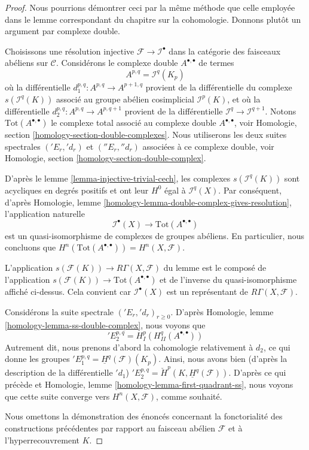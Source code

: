 \begin{proof}
Nous pourrions démontrer ceci par la même méthode que celle employée dans le lemme
correspondant du chapitre sur la cohomologie. Donnons plutôt un argument
par complexe double.

\medskip\noindent
Choisissons une résolution injective $\mathcal{F} \to \mathcal{I}^\bullet$
dans la catégorie des faisceaux abéliens sur $\mathcal{C}$. Considérons le
complexe double $A^{\bullet, \bullet}$ de termes
$$
A^{p, q} = \mathcal{I}^q(K_p)
$$
où la différentielle $d_1^{p, q} : A^{p, q} \to A^{p + 1, q}$ provient
de la différentielle du complexe $s(\mathcal{I}^q(K))$
associé au groupe abélien cosimplicial $\mathcal{I}^p(K)$,
et où la différentielle $d_2^{p, q} : A^{p, q} \to A^{p, q + 1}$ provient
de la différentielle $\mathcal{I}^q \to \mathcal{I}^{q + 1}$.
Notons $\text{Tot}(A^{\bullet, \bullet})$ le complexe total associé au
complexe double $A^{\bullet, \bullet}$, voir
Homologie, section \ref{homology-section-double-complexes}.
Nous utiliserons les deux suites
spectrales $({}'E_r, {}'d_r)$ et $({}''E_r, {}''d_r)$
associées à ce complexe double, voir
Homologie, section \ref{homology-section-double-complex}.

\medskip\noindent
D'après le lemme \ref{lemma-injective-trivial-cech},
les complexes $s(\mathcal{I}^q(K))$ sont acycliques en
degrés positifs et ont leur $H^0$ égal à $\mathcal{I}^q(X)$.
Par conséquent, d'après
Homologie, lemme \ref{homology-lemma-double-complex-gives-resolution},
l'application naturelle
$$
\mathcal{I}^\bullet(X) \longrightarrow \text{Tot}(A^{\bullet, \bullet})
$$
est un quasi-isomorphisme de complexes de groupes abéliens. En particulier,
nous concluons que $H^n(\text{Tot}(A^{\bullet, \bullet})) = H^n(X, \mathcal{F})$.

\medskip\noindent
L'application $s(\mathcal{F}(K)) \longrightarrow R\Gamma(X, \mathcal{F})$ du
lemme est le composé de l'application
$s(\mathcal{F}(K)) \to \text{Tot}(A^{\bullet, \bullet})$
et de l'inverse
du quasi-isomorphisme affiché ci-dessus. Cela convient car
$\mathcal{I}^\bullet(X)$ est un représentant de $R\Gamma(X, \mathcal{F})$.

\medskip\noindent
Considérons la suite spectrale $({}'E_r, {}'d_r)_{r \geq 0}$. D'après
Homologie, lemme \ref{homology-lemma-ss-double-complex},
nous voyons que
$$
{}'E_2^{p, q} = H^p_I(H^q_{II}(A^{\bullet, \bullet}))
$$
Autrement dit, nous prenons d'abord la cohomologie relativement à
$d_2$, ce qui donne les groupes
${}'E_1^{p, q} = \underline{H}^q(\mathcal{F})(K_p)$.
Ainsi, nous avons bien (d'après la description de la différentielle
${}'d_1$)
${}'E_2^{p, q} = \check{H}^p(K, \underline{H}^q(\mathcal{F}))$.
D'après ce qui précède et Homologie, lemme \ref{homology-lemma-first-quadrant-ss},
nous voyons que cette suite converge vers $H^n(X, \mathcal{F})$, comme souhaité.

\medskip\noindent
Nous omettons la démonstration des énoncés concernant la fonctorialité des
constructions précédentes par rapport au faisceau abélien $\mathcal{F}$ et à
l'hyperrecouvrement $K$.
\end{proof}









